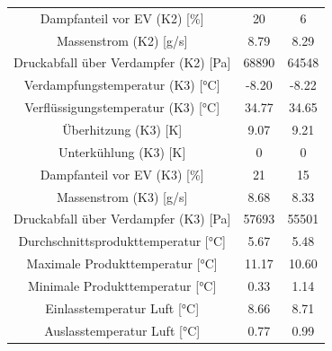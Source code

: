 \begin{table}[h!]
\begin{tabular}{|ccc|}
\multicolumn{1}{|c|}{Dampfanteil vor EV (K2) {[}\%{]}}          & \multicolumn{1}{c|}{20}    & 6            \\
\multicolumn{1}{|c|}{Massenstrom (K2) {[}g/s{]}}                & \multicolumn{1}{c|}{8.79}  & 8.29         \\
\multicolumn{1}{|c|}{Druckabfall über Verdampfer (K2) {[}Pa{]}} & \multicolumn{1}{c|}{68890} & 64548        \\ \hline
\multicolumn{1}{|c|}{Verdampfungstemperatur (K3) {[}°C{]}}      & \multicolumn{1}{c|}{-8.20} & -8.22        \\
\multicolumn{1}{|c|}{Verflüssigungstemperatur (K3) {[}°C{]}}    & \multicolumn{1}{c|}{34.77} & 34.65        \\
\multicolumn{1}{|c|}{Überhitzung (K3) {[}K{]}}                  & \multicolumn{1}{c|}{9.07}  & 9.21         \\
\multicolumn{1}{|c|}{Unterkühlung (K3) {[}K{]}}                 & \multicolumn{1}{c|}{0}     & 0            \\
\multicolumn{1}{|c|}{Dampfanteil vor EV (K3) {[}\%{]}}          & \multicolumn{1}{c|}{21}    & 15           \\
\multicolumn{1}{|c|}{Massenstrom (K3) {[}g/s{]}}                & \multicolumn{1}{c|}{8.68}  & 8.33         \\
\multicolumn{1}{|c|}{Druckabfall über Verdampfer (K3) {[}Pa{]}} & \multicolumn{1}{c|}{57693} & 55501        \\ \hline
\multicolumn{1}{|c|}{Durchschnittsprodukttemperatur {[}°C{]}}   & \multicolumn{1}{c|}{5.67}  & 5.48         \\
\multicolumn{1}{|c|}{Maximale Produkttemperatur {[}°C{]}}       & \multicolumn{1}{c|}{11.17} & 10.60        \\
\multicolumn{1}{|c|}{Minimale Produkttemperatur {[}°C{]}}       & \multicolumn{1}{c|}{0.33}  & 1.14         \\
\multicolumn{1}{|c|}{Einlasstemperatur Luft {[}°C{]}}           & \multicolumn{1}{c|}{8.66}  & 8.71         \\
\multicolumn{1}{|c|}{Auslasstemperatur Luft {[}°C{]}}           & \multicolumn{1}{c|}{0.77}  & 0.99         \\ \hline
\end{tabular}
\end{table}

